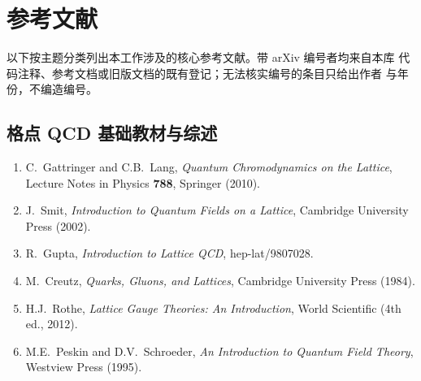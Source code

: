 \documentclass[11pt,a4paper]{ctexart}
\begin{document}
\section{参考文献}

以下按主题分类列出本工作涉及的核心参考文献。带 arXiv 编号者均来自本库
代码注释、参考文档或旧版文档的既有登记；无法核实编号的条目只给出作者
与年份，不编造编号。

\subsection*{格点 QCD 基础教材与综述}
\begin{enumerate}
  \item C.~Gattringer and C.B.~Lang, \textit{Quantum Chromodynamics on
  the Lattice}, Lecture Notes in Physics \textbf{788}, Springer (2010).
  \item J.~Smit, \textit{Introduction to Quantum Fields on a Lattice},
  Cambridge University Press (2002).
  \item R.~Gupta, \textit{Introduction to Lattice QCD},
  hep-lat/9807028.
  \item M.~Creutz, \textit{Quarks, Gluons, and Lattices}, Cambridge
  University Press (1984).
  \item H.J.~Rothe, \textit{Lattice Gauge Theories: An Introduction},
  World Scientific (4th ed., 2012).
  \item M.E.~Peskin and D.V.~Schroeder, \textit{An Introduction to
  Quantum Field Theory}, Westview Press (1995).
\end{enumerate}
\end{document}
